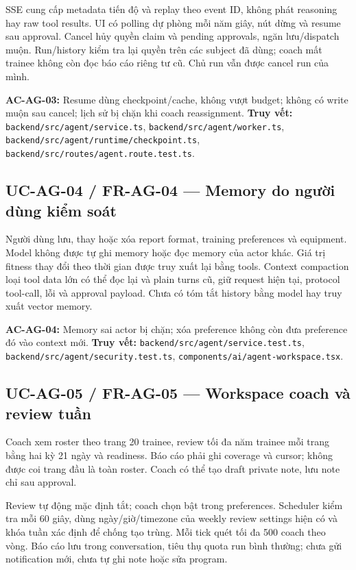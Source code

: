 \documentclass[12pt,a4paper]{article}
\newcommand{\evidence}[1]{{\small\nolinkurl{#1}}}
\begin{document}
SSE cung cấp metadata tiến độ và replay theo event ID, không phát reasoning hay raw tool results. UI có polling dự phòng mỗi năm giây, nút dừng và resume sau approval. Cancel hủy quyền claim và pending approvals, ngăn lưu/dispatch muộn. Run/history kiểm tra lại quyền trên các subject đã dùng; coach mất trainee không còn đọc báo cáo riêng tư cũ. Chủ run vẫn được cancel run của mình.

\textbf{AC-AG-03:} Resume dùng checkpoint/cache, không vượt budget; không có write muộn sau cancel; lịch sử bị chặn khi coach reassignment. \textbf{Truy vết:} \evidence{backend/src/agent/service.ts}, \evidence{backend/src/agent/worker.ts}, \evidence{backend/src/agent/runtime/checkpoint.ts}, \evidence{backend/src/routes/agent.route.test.ts}.

\subsection{UC-AG-04 / FR-AG-04 --- Memory do người dùng kiểm soát}
Người dùng lưu, thay hoặc xóa report format, training preferences và equipment. Model không được tự ghi memory hoặc đọc memory của actor khác. Giá trị fitness thay đổi theo thời gian được truy xuất lại bằng tools. Context compaction loại tool data lớn có thể đọc lại và plain turns cũ, giữ request hiện tại, protocol tool-call, lỗi và approval payload. Chưa có tóm tắt history bằng model hay truy xuất vector memory.

\textbf{AC-AG-04:} Memory sai actor bị chặn; xóa preference không còn đưa preference đó vào context mới. \textbf{Truy vết:} \evidence{backend/src/agent/service.test.ts}, \evidence{backend/src/agent/security.test.ts}, \evidence{components/ai/agent-workspace.tsx}.

\subsection{UC-AG-05 / FR-AG-05 --- Workspace coach và review tuần}
Coach xem roster theo trang 20 trainee, review tối đa năm trainee mỗi trang bằng hai kỳ 21 ngày và readiness. Báo cáo phải ghi coverage và cursor; không được coi trang đầu là toàn roster. Coach có thể tạo draft private note, lưu note chỉ sau approval.

Review tự động mặc định tắt; coach chọn bật trong preferences. Scheduler kiểm tra mỗi 60 giây, dùng ngày/giờ/timezone của weekly review settings hiện có và khóa tuần xác định để chống tạo trùng. Mỗi tick quét tối đa 500 coach theo vòng. Báo cáo lưu trong conversation, tiêu thụ quota run bình thường; chưa gửi notification mới, chưa tự ghi note hoặc sửa program.
\end{document}
